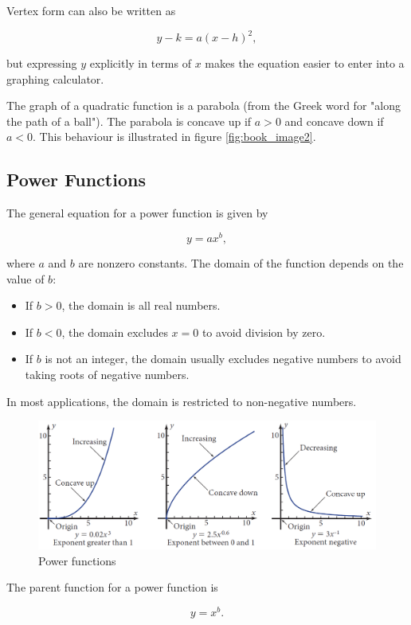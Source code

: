 Vertex form can also be written as

\[
y - k = a(x-h)^2,
\]

but expressing \(y\) explicitly in terms of \(x\) makes the equation easier to enter into a graphing calculator.

The graph of a quadratic function is a parabola (from the Greek word for "along the path of a ball"). The parabola is concave up if \(a > 0\) and concave down if \(a < 0\). This behaviour is illustrated in figure \ref{fig:book_image2}.

\subsection*{Power Functions}
The general equation for a power function is given by

\[
y = ax^b,
\]

where \(a\) and \(b\) are nonzero constants. The domain of the function depends on the value of \(b\):
\begin{itemize}
    \item If \(b > 0\), the domain is all real numbers.
    \item If \(b < 0\), the domain excludes \(x = 0\) to avoid division by zero.
    \item If \(b\) is not an integer, the domain usually excludes negative numbers to avoid taking roots of negative numbers.
\end{itemize}
In most applications, the domain is restricted to non-negative numbers.

\begin{figure}[h]
    \centering
    \includegraphics[width=1\textwidth]{figure/book3.png} %
    \caption{Power functions}
    \label{fig:book_image3}
\end{figure}

The parent function for a power function is

\[
y = x^b.
\]

